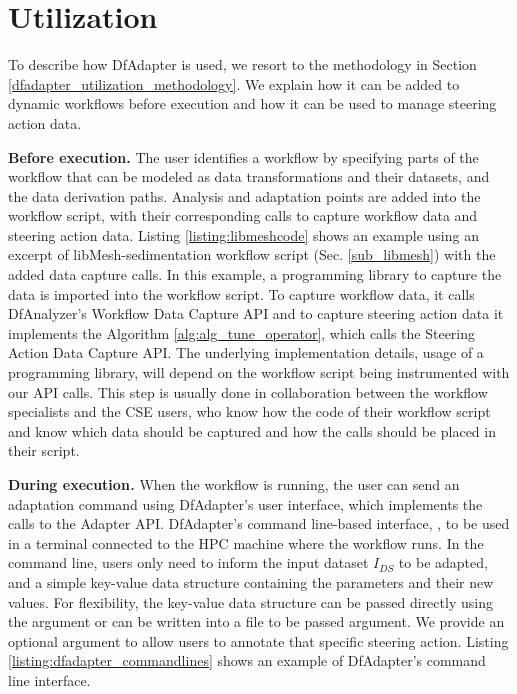 \section{Utilization}
\label{dfadapter_utilization}

To describe how DfAdapter is used, we resort to the methodology in
Section \ref{dfadapter_utilization_methodology}.
We explain how it can be added to dynamic workflows before
execution and how it can be used to manage steering action data.

\textbf{Before execution.} The user identifies a workflow by specifying
parts of the workflow that can be modeled as data transformations and their
datasets, and the data derivation paths. Analysis and adaptation points are added into the workflow script, with their corresponding calls to capture
workflow data and steering action data.
Listing \ref{listing:libmeshcode} shows an example using an excerpt of
libMesh-sedimentation workflow script (Sec. \ref{sub_libmesh}) with the added
data capture calls.
In this example, a programming library to capture the data is imported into the workflow script.
To capture workflow data, it calls DfAnalyzer's Workflow Data Capture API and to capture
steering action data it implements
the Algorithm \ref{alg:alg_tune_operator}, which calls the Steering Action Data Capture API.
The underlying implementation details, \eg{} usage of a programming library,
will depend on the workflow script being instrumented with our API calls. This step is usually
done in collaboration between the workflow specialists and the CSE users, who know how
the code of their workflow script and know which data should be captured and how the calls
should be placed in their script.



\textbf{During execution\emph{. }}
When the workflow is running, the user
can send an adaptation command using DfAdapter's user interface, which implements the calls to the Adapter API.
DfAdapter's command line-based interface, ,
to be used in a terminal connected to
the HPC machine where the workflow runs.
In the command line, users only
need to inform the input dataset $I_{DS}$ to be adapted, and a
simple key-value data structure containing the parameters and their new
values. For flexibility, the key-value data structure can be passed
directly using the argument  or can be written into a file to be
passed argument. We provide an optional argument  to allow
users to annotate that specific steering action.
Listing \ref{listing:dfadapter_commandlines} shows an example
of DfAdapter's command line interface.







